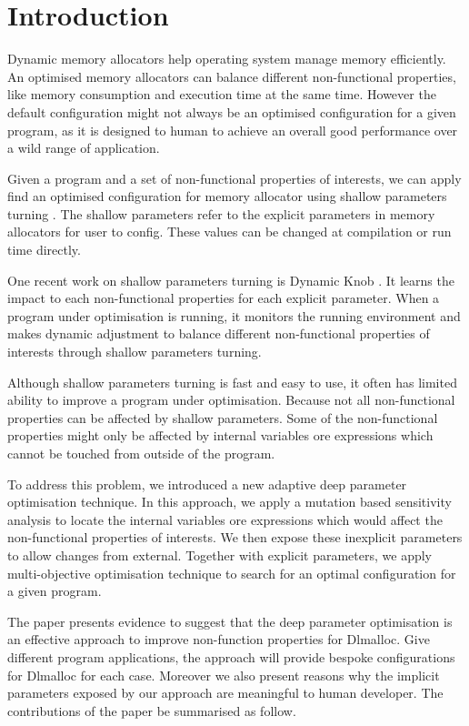 
\section{Introduction}

Dynamic memory allocators help operating system manage memory efficiently. An optimised memory allocators can balance different non-functional properties, like memory consumption and execution time at the same time.
However the default configuration might not always be an optimised configuration for a given program, as it is designed to human to achieve an overall good performance over a wild range of application.

Given a program and a set of non-functional properties of interests, we can apply find an optimised configuration for  memory allocator using shallow parameters turning \cite{hutter2009paramils,Hoffmann:2011:DKR:1961296.1950390}. The shallow parameters refer to the explicit parameters in memory allocators for user to config. These values can be changed at compilation or run time directly. 

One recent work on shallow parameters turning is Dynamic Knob \cite{Hoffmann:2011:DKR:1961296.1950390}. It learns the impact to each non-functional properties for each explicit parameter. When a program under optimisation is running, it monitors the running environment and makes dynamic adjustment to balance different non-functional properties of interests through shallow parameters turning.

Although shallow parameters turning is fast and easy to use, it often has limited ability to improve a program under optimisation. Because not all non-functional properties can be affected by shallow parameters. Some of the non-functional properties might only be affected by internal variables ore expressions which cannot be touched from outside of the program.

To address this problem, we introduced a new adaptive deep parameter optimisation technique. In this approach, we apply a mutation based sensitivity analysis to locate the  internal variables ore expressions which would affect the non-functional properties of interests. We then expose these inexplicit parameters to allow changes from external. Together with explicit parameters, we apply multi-objective optimisation technique to search for an optimal configuration for a given program.


The paper presents evidence to suggest that the deep parameter optimisation is an effective approach to improve non-function properties for Dlmalloc. Give different program applications, the approach will provide bespoke configurations for Dlmalloc for each case. Moreover we also present reasons why the implicit parameters exposed by our approach are meaningful to human developer. The contributions of the paper be summarised as follow.

